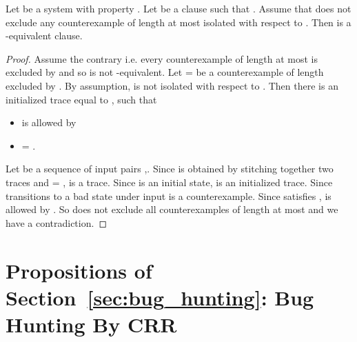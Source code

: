 \begin{proposition}
Let  be a system with property . Let  be a clause such
that . Assume that  does not exclude any
counterexample of length at most  isolated with respect to .
Then  is a -equivalent clause.
\end{proposition}
\begin{proof}
Assume the contrary i.e. every counterexample of length at most  is
excluded by  and so  is not -equivalent. Let
= be a counterexample of length  excluded
by .  By assumption,  is not isolated with respect to . Then
there is an initialized trace  equal to ,  such that
\begin{itemize}
\item  is allowed by 
\item {} = .
\end{itemize}
Let  be a sequence of input pairs
,. Since  is obtained by
stitching together two traces and  = ,  is a
trace.  Since  is an initial state,  is an initialized
trace. Since  transitions to a bad state under
input   is a counterexample.  Since 
satisfies ,  is allowed by .  So  does not exclude all
counterexamples of length at most  and we have a contradiction.
\end{proof}

\section*{Propositions of Section~\ref{sec:bug_hunting}: Bug Hunting By CRR}


